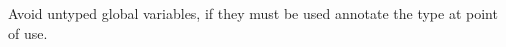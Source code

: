 \documentclass[11pt]{scrartcl} %
\begin{document}
Avoid untyped global variables, if they must be used annotate the type at point of use.








\end{document}
